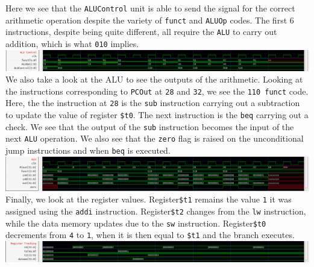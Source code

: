 \documentclass[twocolumn]{article}
\newcommand{\cc}[1]{\texttt{#1}}
\begin{document}
Here we see that the \cc{ALUControl} unit is able to send the signal for the correct arithmetic operation despite the variety of \cc{funct} and \cc{ALUOp} codes. The first 6 instructions, despite being quite different, all require the \cc{ALU} to carry out addition, which is what \cc{010} implies. \\

\begingroup
    \centering
    \medskip
    \includegraphics[width=\columnwidth]{Lab-Tex/Lab5-images/p4.png}
    \medskip
\endgroup
\\

We also take a look at the ALU to see the outputs of the arithmetic. Looking at the instructions corresponding to \cc{PCOut} at \cc{28} and \cc{32}, we see the \cc{110 funct} code. Here, the the instruction at \cc{28} is the \cc{sub} instruction carrying out a subtraction to update the value of register \cc{\$t0}. The next instruction is the \cc{beq} carrying out a check. We see that the output of the \cc{sub} instruction becomes the input of the next \cc{ALU} operation. We also see that the \cc{zero} flag is raised on the unconditional jump instructions and when \cc{beq} is executed. \\

\begingroup
    \centering
    \medskip
    \includegraphics[width=\columnwidth]{Lab-Tex/Lab5-images/p5.png}
    \medskip
\endgroup
\\

Finally, we look at the register values. Register\cc{\$t1} remains the value \cc{1} it was assigned using the \cc{addi} instruction. Register\cc{\$t2} changes from the \cc{lw} instruction, while the data memory updates due to the \cc{sw} instruction.  Register\cc{\$t0} decrements from \cc{4} to \cc{1}, when it is then equal to \cc{\$t1} and the branch executes. \\

\begingroup
    \centering
    \medskip
    \includegraphics[width=\columnwidth]{Lab-Tex/Lab5-images/p6.png}
    \medskip
\endgroup
\\
\end{document}
